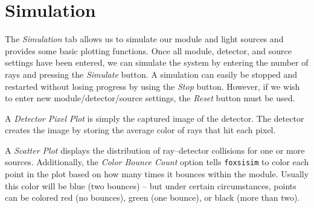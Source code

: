 \documentclass[12pt]{article}
\begin{document}
\section*{Simulation}

The \textit{Simulation} tab allows us to simulate our module and light sources and provides some basic plotting functions. Once all module, detector, and source settings have been entered, we can simulate the system by entering the number of rays and pressing the \textit{Simulate} button. A simulation can easily be stopped and restarted without losing progress by using the \textit{Stop} button. However, if we wish to enter new module/detector/source settings, the \textit{Reset} button must be used.

A \textit{Detector Pixel Plot} is simply the captured image of the detector. The detector creates the image by storing the average color of rays that hit each pixel.

A \textit{Scatter Plot} displays the distribution of ray--detector collisions for one or more sources. Additionally, the \textit{Color Bounce Count} option tells \texttt{foxsisim} to color each point in the plot based on how many times it bounces within the module. Usually this color will be blue (two bounces) -- but under certain circumstances, points can be colored red (no bounces), green (one bounce), or black (more than two).
\end{document}
